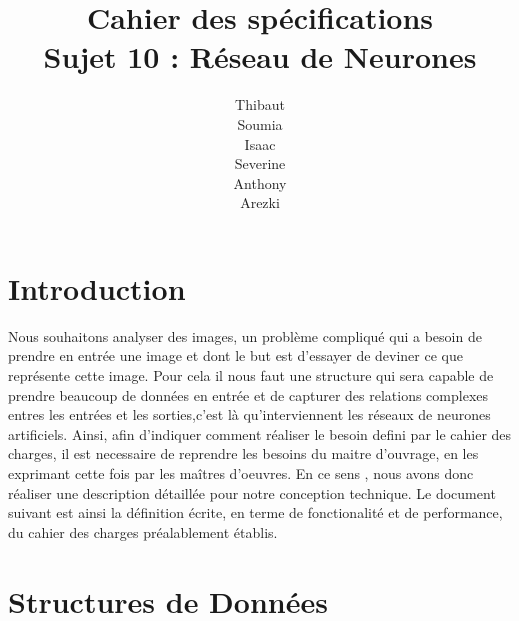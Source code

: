 \documentclass{article}
\begin{document}
\newpage
\title{Cahier des spécifications\\Sujet 10 : Réseau de Neurones}
\author{Thibaut \\Soumia {}\\Isaac {}\\Severine {}\\Anthony {}\\Arezki {}}
\maketitle

\newpage

\small{\tableofcontents}

\newpage
\section{Introduction}
 Nous souhaitons analyser des images, un problème compliqué qui a besoin de prendre en entrée une image et dont le but est d'essayer de deviner ce que représente cette image.
Pour cela il nous faut une structure qui sera capable de prendre beaucoup de données en entrée et de capturer des relations complexes entres les entrées et les sorties,c'est là qu'interviennent les réseaux de neurones artificiels.
Ainsi, afin d'indiquer comment réaliser le besoin defini par le cahier des charges, il est necessaire de reprendre les besoins du maitre d'ouvrage, en les exprimant cette fois par les maîtres d'oeuvres.
En ce sens , nous avons donc réaliser une description détaillée pour notre conception technique. Le document suivant est ainsi la définition écrite, en terme de fonctionalité et de performance, du cahier des charges préalablement établis.

\section{Structures de Données}
\end{document}
